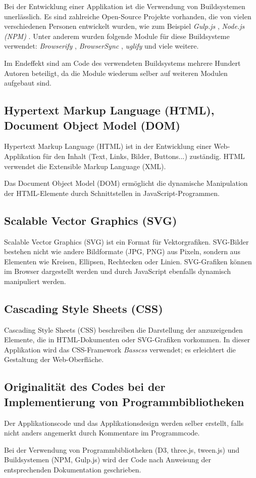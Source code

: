 Bei der Entwicklung einer Applikation ist die Verwendung von Buildsystemen unerlässlich. Es sind zahlreiche Open-Source Projekte vorhanden, die von vielen verschiedenen Personen entwickelt wurden, wie zum Beispiel \textit{Gulp.js} \cite{gulp.js}, \textit{Node.js (NPM)} \cite{npm}. Unter anderem wurden folgende Module für diese Buildsysteme verwendet: \textit{Browserify} \cite{browserify},  \textit{BrowserSync} \cite{browsersync}, \textit{uglify} \cite{uglify} und viele weitere.

Im Endeffekt sind am Code des verwendeten Buildsystems mehrere Hundert Autoren beteiligt, da die Module wiederum selber auf weiteren Modulen aufgebaut sind.

\subsection{Hypertext Markup Language (HTML), Document Object Model (DOM)} \label{sec:dom}

Hypertext Markup Language (HTML) ist in der Entwicklung einer Web-Applikation für den Inhalt (Text, Links, Bilder, Buttons...) zuständig. HTML verwendet die Extensible Markup Language (XML).

Das Document Object Model (DOM) ermöglicht die dynamische Manipulation der HTML-Elemente durch Schnittstellen in JavaScript-Programmen.

\subsection{Scalable Vector Graphics (SVG)}

Scalable Vector Graphics (SVG) ist ein Format für Vektorgrafiken. SVG-Bilder bestehen nicht wie andere Bildformate (JPG, PNG) aus Pixeln, sondern aus Elementen wie Kreisen, Ellipsen, Rechtecken oder Linien. SVG-Grafiken können im Browser dargestellt werden und durch JavaScript ebenfalls dynamisch manipuliert werden.

\subsection{Cascading Style Sheets (CSS)}

Cascading Style Sheets (CSS) beschreiben die Darstellung der anzuzeigenden Elemente, die in HTML-Dokumenten oder SVG-Grafiken vorkommen. In dieser Applikation wird das CSS-Framework \textit{Basscss} \cite{basscss} verwendet; es erleichtert die Gestaltung der Web-Oberfläche.

\subsection{Originalität des Codes bei der Implementierung von Programmbibliotheken}

Der Applikationscode und das Applikationsdesign werden selber erstellt, falls nicht anders angemerkt durch Kommentare im Programmcode.

Bei der Verwendung von Programmbibliotheken (D3, three.js, tween.js) und Buildsystemen (NPM, Gulp.js) wird der Code nach Anweisung der entsprechenden Dokumentation geschrieben.